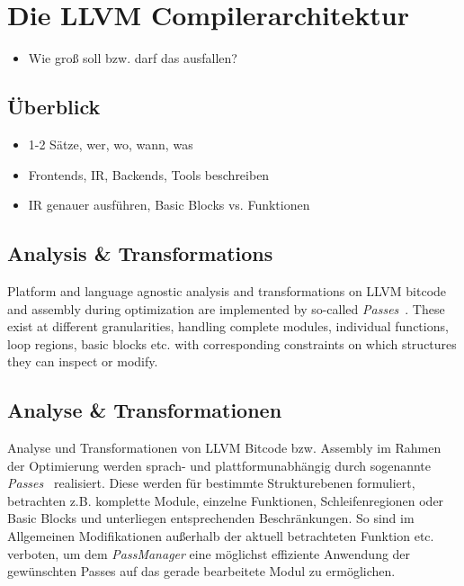 \section{Die LLVM Compilerarchitektur}

\begin{leftbar}
  \begin{itemize}
    \item Wie groß soll bzw. darf das ausfallen?
  \end{itemize}
\end{leftbar}

\subsection{Überblick}

\begin{leftbar}
  \begin{itemize}
    \item 1-2 Sätze, wer, wo, wann, was
    \item Frontends, IR, Backends, Tools beschreiben
    \item IR genauer ausführen, Basic Blocks vs. Funktionen
  \end{itemize}
\end{leftbar}


\begin{leftbar}
\subsection{Analysis \& Transformations}

Platform and language agnostic analysis and transformations on LLVM bitcode and
assembly during optimization are implemented by so-called
\emph{Passes}~\cite{llvm-passes}. These exist at different granularities,
handling complete modules, individual functions, loop regions, basic blocks
etc. with corresponding constraints on which structures they can inspect or
modify.
\end{leftbar}

\subsection{Analyse \& Transformationen}

Analyse und Transformationen von LLVM Bitcode bzw. Assembly im Rahmen der
Optimierung werden sprach- und plattformunabhängig durch sogenannte
\emph{Passes}~\cite{llvm-passes} realisiert. Diese werden für bestimmte
Strukturebenen formuliert, betrachten z.B. komplette Module, einzelne
Funktionen, Schleifenregionen oder Basic Blocks und unterliegen entsprechenden
Beschränkungen. So sind im Allgemeinen Modifikationen außerhalb der aktuell
betrachteten Funktion etc.  verboten, um dem \emph{PassManager} eine möglichst
effiziente Anwendung der gewünschten Passes auf das gerade bearbeitete Modul zu
ermöglichen.

